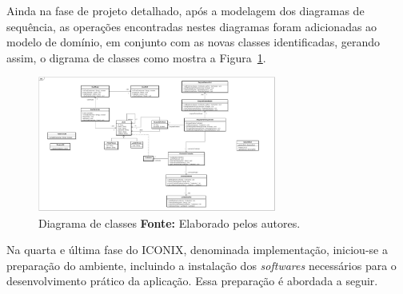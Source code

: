 \par Ainda na fase de projeto detalhado, após a modelagem dos diagramas de sequência, as operações encontradas nestes diagramas foram adicionadas ao modelo de domínio, em conjunto com as novas classes identificadas, gerando assim, o digrama de classes como mostra a Figura~\ref{fig:diagrama_classe}.

\begin{figure}[h!]
	\centerline{\includegraphics[angle=90,height=0.7\textheight,width=0.7\textwidth]{./imagens/classe.jpg}}
	\caption[Diagrama de classes]
	{Diagrama de classes \textbf{Fonte:} Elaborado pelos autores.}
	\label{fig:diagrama_classe}
\end{figure}

\newpage
\par Na quarta e última fase do ICONIX, denominada implementação, iniciou-se a preparação do ambiente, incluindo a instalação dos \textit{softwares} necessários para o desenvolvimento prático da aplicação. Essa preparação é abordada a seguir.
